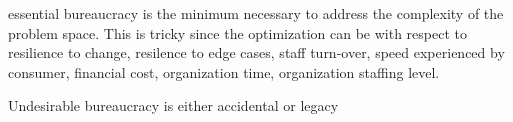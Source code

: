essential bureaucracy is the minimum necessary to address the complexity of the problem space. This is tricky since the optimization can be with respect to resilience to change, resilence to edge cases, staff turn-over, speed experienced by consumer, financial cost, organization time, organization staffing level.

Undesirable bureaucracy is either accidental or legacy